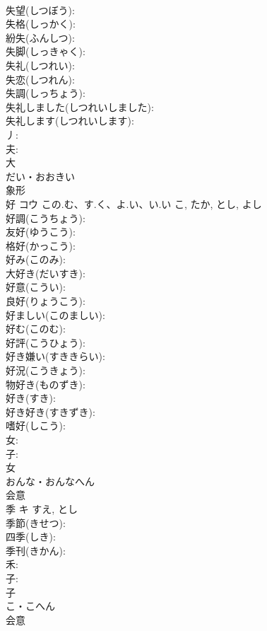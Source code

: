 \documentclass[8pt]{extreport}
\begin{document}
\begin{CJK}{UTF8}{min}
\\	失望(しつぼう): 
\\	失格(しっかく): 
\\	紛失(ふんしつ): 
\\	失脚(しっきゃく): 
\\	失礼(しつれい): 
\\	失恋(しつれん): 
\\	失調(しっちょう): 
\\	失礼しました(しつれいしました): 
\\	失礼します(しつれいします): 
\\	丿: 
\\	夫: 
\\	大	
\\	だい・おおきい	
\\	象形 
\\	好	コウ	この.む、す.く、よ.い、い.い	こ, たか, とし, よし	
\\	好調(こうちょう): 
\\	友好(ゆうこう): 
\\	格好(かっこう): 
\\	好み(このみ): 
\\	大好き(だいすき): 
\\	好意(こうい): 
\\	良好(りょうこう): 
\\	好ましい(このましい): 
\\	好む(このむ): 
\\	好評(こうひょう): 
\\	好き嫌い(すききらい): 
\\	好況(こうきょう): 
\\	物好き(ものずき): 
\\	好き(すき): 
\\	好き好き(すきずき): 
\\	嗜好(しこう): 
\\	女: 
\\	子: 
\\	女	
\\	おんな・おんなへん	
\\	会意 
\\	季	キ		すえ, とし	
\\	季節(きせつ): 
\\	四季(しき): 
\\	季刊(きかん): 
\\	禾: 
\\	子: 
\\	子	
\\	こ・こへん	
\\	会意 

\end{CJK}
\end{document}
